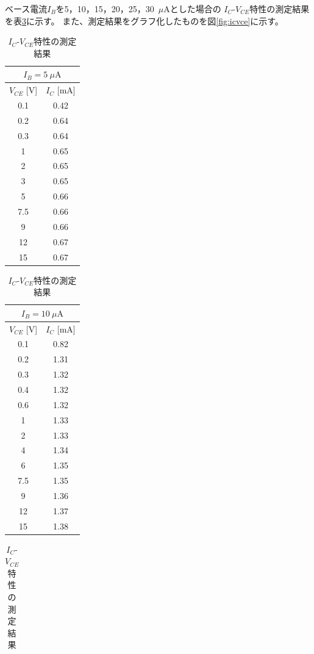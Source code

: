 \documentclass[11pt,a4paper]{jsarticle}
\begin{document}
ベース電流$I_B$を5，10，15，20，25，30~$\mu$Aとした場合の
$I_C$-$V_{CE}$特性の測定結果を表\ref{tab:icvce}に示す。
また、測定結果をグラフ化したものを図\ref{fig:icvce}に示す。


\begin{table}[H]
\centering
\caption{$I_C$-$V_{CE}$特性の測定結果}
\label{tab:icvce}

\begin{minipage}{0.3\textwidth}
\centering
\small
\begin{tabular}{cc}
\toprule
\multicolumn{2}{c}{$I_B=5~\mu\mathrm{A}$}\\
\midrule
$V_{CE}$ [V] & $I_C$ [mA]\\
\midrule
0.1&0.42\\
0.2&0.64\\
0.3&0.64\\
1&0.65\\
2&0.65\\
3&0.65\\
5&0.66\\
7.5&0.66\\
9&0.66\\
12&0.67\\
15&0.67\\
\bottomrule
\end{tabular}
\end{minipage}
\hfill
\begin{minipage}{0.3\textwidth}
\centering
\small
\begin{tabular}{cc}
\toprule
\multicolumn{2}{c}{$I_B=10~\mu\mathrm{A}$}\\
\midrule
$V_{CE}$ [V] & $I_C$ [mA]\\
\midrule
0.1&0.82\\
0.2&1.31\\
0.3&1.32\\
0.4&1.32\\
0.6&1.32\\
1&1.33\\
2&1.33\\
4&1.34\\
6&1.35\\
7.5&1.35\\
9&1.36\\
12&1.37\\
15&1.38\\
\bottomrule
\end{tabular}
\end{minipage}
\hfill
\begin{minipage}{0.3\textwidth}
\centering
\small
\begin{tabular}{cc}

\end{tabular}
\end{minipage}
\end{table}
\end{document}
